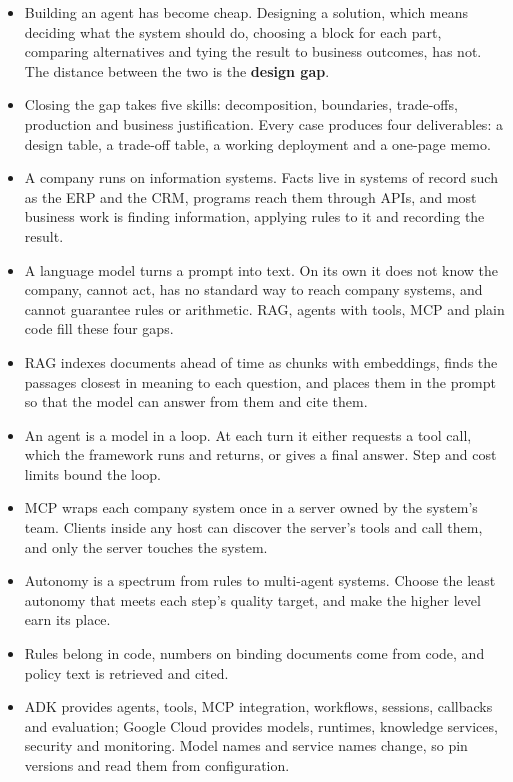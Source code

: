 \begin{itemize}[itemsep=2pt]
  \item Building an agent has become cheap. Designing a solution, which means deciding what the system should do, choosing a block for each part, comparing alternatives and tying the result to business outcomes, has not. The distance between the two is the \textbf{design gap}.
  \item Closing the gap takes five skills: decomposition, boundaries, trade-offs, production and business justification. Every case produces four deliverables: a design table, a trade-off table, a working deployment and a one-page memo.
  \item A company runs on information systems. Facts live in systems of record such as the ERP and the CRM, programs reach them through APIs, and most business work is finding information, applying rules to it and recording the result.
  \item A language model turns a prompt into text. On its own it does not know the company, cannot act, has no standard way to reach company systems, and cannot guarantee rules or arithmetic. RAG, agents with tools, MCP and plain code fill these four gaps.
  \item RAG indexes documents ahead of time as chunks with embeddings, finds the passages closest in meaning to each question, and places them in the prompt so that the model can answer from them and cite them.
  \item An agent is a model in a loop. At each turn it either requests a tool call, which the framework runs and returns, or gives a final answer. Step and cost limits bound the loop.
  \item MCP wraps each company system once in a server owned by the system's team. Clients inside any host can discover the server's tools and call them, and only the server touches the system.
  \item Autonomy is a spectrum from rules to multi-agent systems. Choose the least autonomy that meets each step's quality target, and make the higher level earn its place.
  \item Rules belong in code, numbers on binding documents come from code, and policy text is retrieved and cited.
  \item ADK provides agents, tools, MCP integration, workflows, sessions, callbacks and evaluation; Google Cloud provides models, runtimes, knowledge services, security and monitoring. Model names and service names change, so pin versions and read them from configuration.
\end{itemize}

